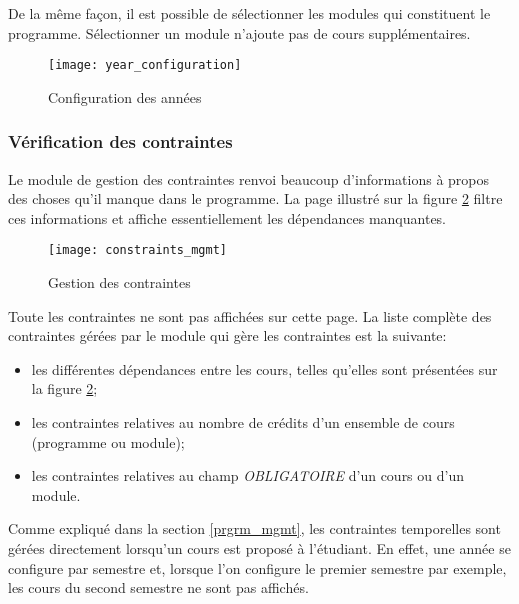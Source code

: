 De la même façon, il est possible de sélectionner les modules qui constituent le programme. Sélectionner un module n'ajoute pas de cours supplémentaires.
\begin{figure}
\centering
\caption{Configuration des années}
\label{fig:year_configuration}
\texttt{[image: year\_configuration]}
\end{figure}

\subsubsection{Vérification des contraintes}
Le module de gestion des contraintes renvoi beaucoup d'informations à propos des choses qu'il manque dans le programme. La page illustré sur la figure \ref{fig:constraint_mgmt} filtre ces informations et affiche essentiellement les dépendances manquantes.

\begin{figure}
\centering
\caption{Gestion des contraintes}
\label{fig:constraint_mgmt}
\texttt{[image: constraints\_mgmt]}
\end{figure} 

Toute les contraintes ne sont pas affichées sur cette page. La liste complète des contraintes gérées par le module qui gère les contraintes est la suivante:
\begin{itemize}
  \item les différentes dépendances entre les cours, telles qu'elles sont présentées sur la figure \ref{fig:constraint_mgmt};
  \item les contraintes relatives au nombre de crédits d'un ensemble de cours (programme ou module);
  \item les contraintes relatives au champ \textit{OBLIGATOIRE} d'un cours ou d'un module.
\end{itemize}

Comme expliqué dans la section \ref{prgrm_mgmt}, les contraintes temporelles sont gérées directement lorsqu'un cours est proposé à l'étudiant. En effet, une année se configure par semestre et, lorsque l'on configure le premier semestre par exemple, les cours du second semestre ne sont pas affichés. 

